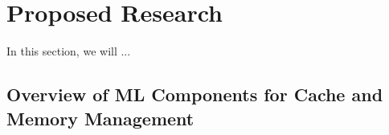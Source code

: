 \section{Proposed Research}

In this section, we will ...

\subsection{}

\subsection{Overview of ML Components for Cache and Memory Management}




